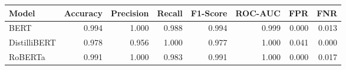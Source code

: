 \begin{tabular}{|l||r|r|r|r|r|r|r|}
\toprule
Model & \textbf{Accuracy} & \textbf{Precision} & Recall & \textbf{F1-Score} & \textbf{ROC-AUC} & \textbf{FPR} & FNR \\
\midrule \midrule
BERT & 0.994 & 1.000 & 0.988 & 0.994 & 0.999 & 0.000 & 0.013 \\
DistilliBERT & 0.978 & 0.956 & 1.000 & 0.977 & 1.000 & 0.041 & 0.000 \\
RoBERTa & 0.991 & 1.000 & 0.983 & 0.991 & 1.000 & 0.000 & 0.017 \\
\bottomrule
\end{tabular}
